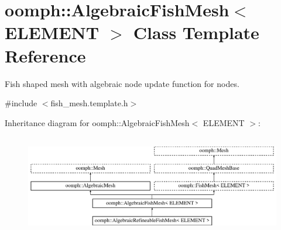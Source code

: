 \hypertarget{classoomph_1_1AlgebraicFishMesh}{}\section{oomph\+:\+:Algebraic\+Fish\+Mesh$<$ E\+L\+E\+M\+E\+NT $>$ Class Template Reference}
\label{classoomph_1_1AlgebraicFishMesh}


Fish shaped mesh with algebraic node update function for nodes.  




{\ttfamily \#include $<$fish\+\_\+mesh.\+template.\+h$>$}

Inheritance diagram for oomph\+:\+:Algebraic\+Fish\+Mesh$<$ E\+L\+E\+M\+E\+NT $>$\+:\begin{figure}[H]
\begin{center}
\leavevmode
\includegraphics[height=4.444445cm]{classoomph_1_1AlgebraicFishMesh}
\end{center}
\end{figure}
